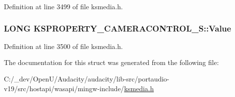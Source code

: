 Definition at line 3499 of file ksmedia.\+h.

\subsubsection[{\texorpdfstring{Value}{Value}}]{\setlength{\rightskip}{0pt plus 5cm}L\+O\+NG K\+S\+P\+R\+O\+P\+E\+R\+T\+Y\+\_\+\+C\+A\+M\+E\+R\+A\+C\+O\+N\+T\+R\+O\+L\+\_\+\+S\+::\+Value}\hypertarget{struct_k_s_p_r_o_p_e_r_t_y___c_a_m_e_r_a_c_o_n_t_r_o_l___s_a47a420209e94a9d7bdb62058e6112e3c}{}\label{struct_k_s_p_r_o_p_e_r_t_y___c_a_m_e_r_a_c_o_n_t_r_o_l___s_a47a420209e94a9d7bdb62058e6112e3c}


Definition at line 3500 of file ksmedia.\+h.



The documentation for this struct was generated from the following file\+:\begin{DoxyCompactItemize}
\item 
C\+:/\+\_\+dev/\+Open\+U/\+Audacity/audacity/lib-\/src/portaudio-\/v19/src/hostapi/wasapi/mingw-\/include/\hyperlink{ksmedia_8h}{ksmedia.\+h}\end{DoxyCompactItemize}
